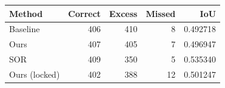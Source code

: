 \begin{tabular}{lrrrr}
\toprule
Method & Correct & Excess & Missed & IoU \\
\midrule
Baseline & 406 & 410 & 8 & 0.492718 \\
Ours & 407 & 405 & 7 & 0.496947 \\
SOR & 409 & 350 & 5 & 0.535340 \\
Ours (locked) & 402 & 388 & 12 & 0.501247 \\
\bottomrule
\end{tabular}
